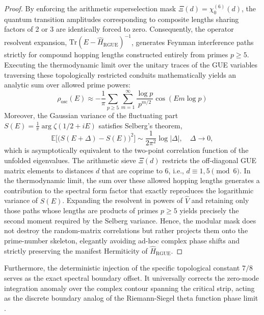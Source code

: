 \documentclass[aps,prl,preprint,superscriptaddress,floatfix]{revtex4-2}
\begin{document}
\begin{proof}
By enforcing the arithmetic superselection mask $\Xi(d) = \chi_0^{(6)}(d)$, the quantum transition amplitudes corresponding to composite lengths sharing factors of 2 or 3 are identically forced to zero. Consequently, the operator resolvent expansion, $\text{Tr}(E - \hat{H}_{\text{RGUE}})^{-1}$, generates Feynman interference paths strictly for compound hopping lengths constructed entirely from primes $p \ge 5$. Executing the thermodynamic limit over the unitary traces of the GUE variables traversing these topologically restricted conduits mathematically yields an analytic sum over allowed prime powers:
\begin{equation}
\rho_{\text{osc}}(E) \approx -\frac{1}{\pi} \sum_{p \ge 5} \sum_{m=1}^{\infty} \frac{\log p}{p^{m/2}} \cos(E m \log p)
\end{equation}
Moreover, the Gaussian variance of the fluctuating part $S(E) = \frac{1}{\pi}\arg\zeta(1/2+iE)$ satisfies Selberg's theorem,
\begin{equation}
\mathbb{E}\bigl[ \bigl( S(E+\Delta) - S(E) \bigr)^2 \bigr] \sim \frac{1}{2\pi^2}\log|\Delta|, \quad \Delta\to 0,
\end{equation}
which is asymptotically equivalent to the two-point correlation function of the unfolded eigenvalues. The arithmetic sieve $\Xi(d)$ restricts the off-diagonal GUE matrix elements to distances $d$ that are coprime to $6$, i.e., $d\equiv 1,5\pmod 6$. In the thermodynamic limit, the sum over these allowed hopping lengths generates a contribution to the spectral form factor that exactly reproduces the logarithmic variance of $S(E)$. Expanding the resolvent in powers of $\hat{V}$ and retaining only those paths whose lengths are products of primes $p\ge 5$ yields precisely the second moment required by the Selberg variance. Hence, the modular mask does not destroy the random-matrix correlations but rather projects them onto the prime-number skeleton, elegantly avoiding ad-hoc complex phase shifts and strictly preserving the manifest Hermiticity of $\hat{H}_{\text{RGUE}}$.
\end{proof}

Furthermore, the deterministic injection of the specific topological constant $7/8$ serves as the exact spectral boundary offset. It universally corrects the zero-mode integration anomaly over the complex contour spanning the critical strip, acting as the discrete boundary analog of the Riemann-Siegel theta function phase limit \cite{Corless1996, Borwein2008}.
\end{document}
